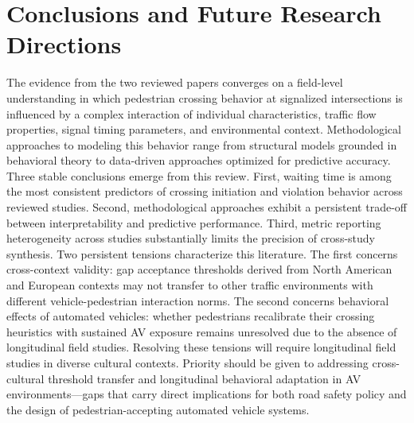 \documentclass{article}
\begin{document}
\section{Conclusions and Future Research Directions}
The evidence from the two reviewed papers converges on a field-level understanding in which pedestrian crossing behavior at signalized intersections is influenced by a complex interaction of individual characteristics, traffic flow properties, signal timing parameters, and environmental context. Methodological approaches to modeling this behavior range from structural models grounded in behavioral theory to data-driven approaches optimized for predictive accuracy. Three stable conclusions emerge from this review. First, waiting time is among the most consistent predictors of crossing initiation and violation behavior across reviewed studies. Second, methodological approaches exhibit a persistent trade-off between interpretability and predictive performance. Third, metric reporting heterogeneity across studies substantially limits the precision of cross-study synthesis. Two persistent tensions characterize this literature. The first concerns cross-context validity: gap acceptance thresholds derived from North American and European contexts may not transfer to other traffic environments with different vehicle-pedestrian interaction norms. The second concerns behavioral effects of automated vehicles: whether pedestrians recalibrate their crossing heuristics with sustained AV exposure remains unresolved due to the absence of longitudinal field studies. Resolving these tensions will require longitudinal field studies in diverse cultural contexts. Priority should be given to addressing cross-cultural threshold transfer and longitudinal behavioral adaptation in AV environments—gaps that carry direct implications for both road safety policy and the design of pedestrian-accepting automated vehicle systems.
\end{document}
